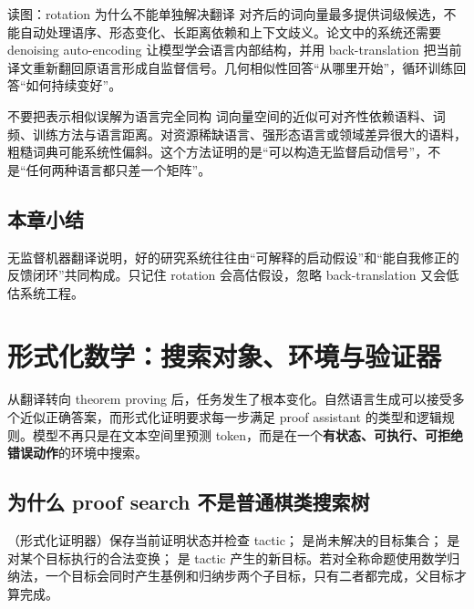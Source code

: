 \documentclass[a4paper]{article}
\begin{document}
\begin{knowledgebox}{读图：rotation 为什么不能单独解决翻译}
对齐后的词向量最多提供词级候选，不能自动处理语序、形态变化、长距离依赖和上下文歧义。论文中的系统还需要 denoising auto-encoding 让模型学会语言内部结构，并用 back-translation 把当前译文重新翻回原语言形成自监督信号。几何相似性回答“从哪里开始”，循环训练回答“如何持续变好”。
\end{knowledgebox}

\begin{warningbox}{不要把表示相似误解为语言完全同构}
词向量空间的近似可对齐性依赖语料、词频、训练方法与语言距离。对资源稀缺语言、强形态语言或领域差异很大的语料，粗糙词典可能系统性偏斜。这个方法证明的是“可以构造无监督启动信号”，不是“任何两种语言都只差一个矩阵”。
\end{warningbox}


\subsection{本章小结}

无监督机器翻译说明，好的研究系统往往由“可解释的启动假设”和“能自我修正的反馈闭环”共同构成。只记住 rotation 会高估假设，忽略 back-translation 又会低估系统工程。

\section{形式化数学：搜索对象、环境与验证器}

从翻译转向 theorem proving 后，任务发生了根本变化。自然语言生成可以接受多个近似正确答案，而形式化证明要求每一步满足 proof assistant 的类型和逻辑规则。模型不再只是在文本空间里预测 token，而是在一个\textbf{有状态、可执行、可拒绝错误动作}的环境中搜索。

\subsection{为什么 proof search 不是普通棋类搜索树}

（形式化证明器）保存当前证明状态并检查 tactic； 是尚未解决的目标集合； 是对某个目标执行的合法变换； 是 tactic 产生的新目标。若对全称命题使用数学归纳法，一个目标会同时产生基例和归纳步两个子目标，只有二者都完成，父目标才算完成。
\end{document}
